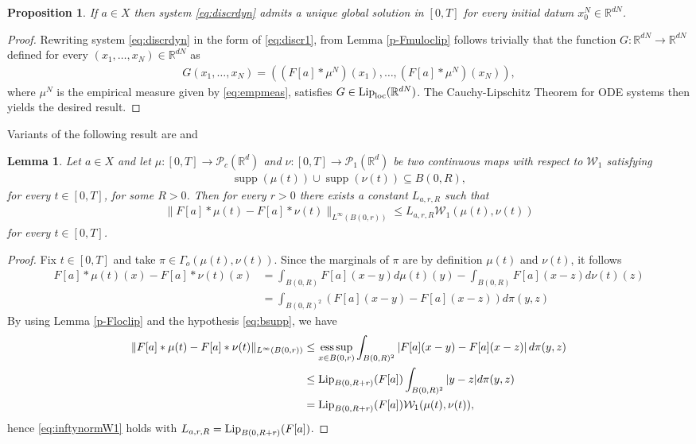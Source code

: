 \documentclass[A4paper,11pt]{article}
\newtheorem{lemma}[theorem]{Lemma}
\newtheorem{proposition}[theorem]{Proposition}
\theoremstyle{definition}
\newcommand{\Lip}{\textup{Lip}}
\newcommand{\loc}{\textup{loc}}
\newcommand{\R}{\mathbb{R}}
\newcommand{\W}{\mathcal{W}}
\newcommand{\PP}{\mathcal{P}_1}
\DeclareMathOperator{\supp}{supp}
\DeclareMathOperator*{\esssup}{ess\,sup}
\begin{document}
\begin{proposition}
If $a \in X$ then system \eqref{eq:discrdyn} admits a unique global solution in $[0,T]$ for every initial datum $x^{N}_0 \in \R^{dN}$.
\end{proposition}
\begin{proof}
Rewriting system \eqref{eq:discrdyn} in the form of \eqref{eq:discr1}, from Lemma \ref{p-Fmuloclip} follows trivially that the function $G:\R^{dN} \rightarrow \R^{dN}$ defined for every $(x_1, \ldots, x_N)\in \R^{dN}$ as
\begin{align*}
G(x_1, \ldots, x_N) = ((F[a]*\mu^N)(x_1),\ldots,(F[a]*\mu^N)(x_N)),
\end{align*}
where $\mu^N$ is the empirical measure given by \eqref{eq:empmeas}, satisfies $G \in \Lip_\loc(\R^{dN})$. The Cauchy-Lipschitz Theorem for ODE systems then yields the desired result.
\end{proof}

Variants of the following result are \cite[Lemma 6.7]{MFOC} and \cite[Lemma 4.7]{CanCarRos10}

\begin{lemma}\label{p-lipkernel}
Let $a \in X$ and let $\mu:[0,T] \rightarrow \mathcal{P}_c(\R^d)$ and $\nu: [0,T] \to \PP(\R^d)$ be two continuous maps with respect to $\W_1$ satisfying
\begin{align}\label{eq:bsupp}
\supp(\mu(t)) \cup \supp(\nu(t)) \subseteq B(0,R),
\end{align}
for every $t \in [0,T]$, for some $R > 0$. Then for every $r > 0$ there exists a constant $L_{a,r,R}$ such that
\begin{align}\label{eq:inftynormW1}
\|F[a] * \mu(t) - F[a] * \nu(t)\|_{L^{\infty}(B(0,r))} \leq L_{a,r,R} \W_1(\mu(t),\nu(t))
\end{align}
for every $t \in [0,T]$.
\end{lemma}
\begin{proof}
Fix $t \in [0,T]$ and take $\pi \in \Gamma_o(\mu(t),\nu(t))$. Since the marginals of $\pi$ are by definition $\mu(t)$ and $\nu(t)$, it follows
\begin{align*}
F[a] * \mu(t)(x) - F[a] * \nu(t)(x) &= \int_{B(0,R)} F[a](x-y) d\mu(t)(y) - \int_{B(0,R)} F[a](x-z) d\nu(t)(z)  \\
&= \int_{B(0,R)^2} \left(F[a](x-y) - F[a](x-z)\right) d\pi(y,z)
\end{align*}
By using Lemma \ref{p-Floclip} and the hypothesis \eqref{eq:bsupp}, we have
\begin{align*}
\|F[a] * \mu(t) - F[a] * \nu(t)\|_{L^{\infty}(B(0,r))} &\leq \esssup_{x \in B(0,r)} \int_{B(0,R)^2} \left|F[a](x-y) - F[a](x-z)\right| d\pi(y,z) \\
&\leq \Lip_{B(0,R+r)}(F[a]) \int_{B(0,R)^2} |y - z| d\pi(y,z) \\
&= \Lip_{B(0,R+r)}(F[a]) \W_1(\mu(t),\nu(t)),
\end{align*}
hence \eqref{eq:inftynormW1} holds with $L_{a,r,R} = \Lip_{B(0,R+r)}(F[a])$.
\end{proof}
\end{document}
